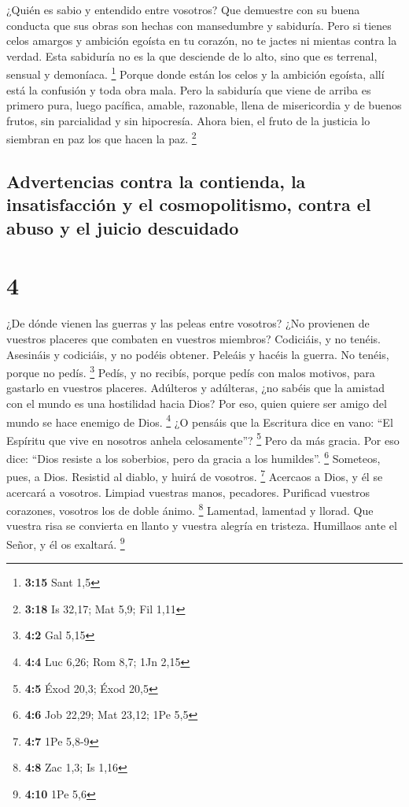  ¿Quién es sabio y entendido entre vosotros? Que
demuestre con su buena conducta que sus obras son hechas con mansedumbre
y sabiduría.  Pero si tienes celos amargos y ambición
egoísta en tu corazón, no te jactes ni mientas contra la verdad.
 Esta sabiduría no es la que desciende de lo alto, sino
que es terrenal, sensual y demoníaca. \footnote{\textbf{3:15} Sant 1,5}
 Porque donde están los celos y la ambición egoísta, allí
está la confusión y toda obra mala.  Pero la sabiduría
que viene de arriba es primero pura, luego pacífica, amable, razonable,
llena de misericordia y de buenos frutos, sin parcialidad y sin
hipocresía.  Ahora bien, el fruto de la justicia lo
siembran en paz los que hacen la paz. \footnote{\textbf{3:18} Is 32,17;
  Mat 5,9; Fil 1,11}

\hypertarget{advertencias-contra-la-contienda-la-insatisfacciuxf3n-y-el-cosmopolitismo-contra-el-abuso-y-el-juicio-descuidado}{%
\subsection{Advertencias contra la contienda, la insatisfacción y el
cosmopolitismo, contra el abuso y el juicio
descuidado}\label{advertencias-contra-la-contienda-la-insatisfacciuxf3n-y-el-cosmopolitismo-contra-el-abuso-y-el-juicio-descuidado}}

\hypertarget{section-3}{%
\section{4}\label{section-3}}

 ¿De dónde vienen las guerras y las peleas entre vosotros?
¿No provienen de vuestros placeres que combaten en vuestros miembros?
 Codiciáis, y no tenéis. Asesináis y codiciáis, y no
podéis obtener. Peleáis y hacéis la guerra. No tenéis, porque no pedís.
\footnote{\textbf{4:2} Gal 5,15}  Pedís, y no recibís,
porque pedís con malos motivos, para gastarlo en vuestros placeres.
 Adúlteros y adúlteras, ¿no sabéis que la amistad con el
mundo es una hostilidad hacia Dios? Por eso, quien quiere ser amigo del
mundo se hace enemigo de Dios. \footnote{\textbf{4:4} Luc 6,26; Rom 8,7;
  1Jn 2,15}  ¿O pensáis que la Escritura dice en vano:
``El Espíritu que vive en nosotros anhela celosamente''? \footnote{\textbf{4:5}
  Éxod 20,3; Éxod 20,5}  Pero da más gracia. Por eso dice:
``Dios resiste a los soberbios, pero da gracia a los humildes''.
\footnote{\textbf{4:6} Job 22,29; Mat 23,12; 1Pe 5,5} 
Someteos, pues, a Dios. Resistid al diablo, y huirá de vosotros.
\footnote{\textbf{4:7} 1Pe 5,8-9}  Acercaos a Dios, y él
se acercará a vosotros. Limpiad vuestras manos, pecadores. Purificad
vuestros corazones, vosotros los de doble ánimo. \footnote{\textbf{4:8}
  Zac 1,3; Is 1,16}  Lamentad, lamentad y llorad. Que
vuestra risa se convierta en llanto y vuestra alegría en tristeza.
 Humillaos ante el Señor, y él os exaltará. \footnote{\textbf{4:10}
  1Pe 5,6}

